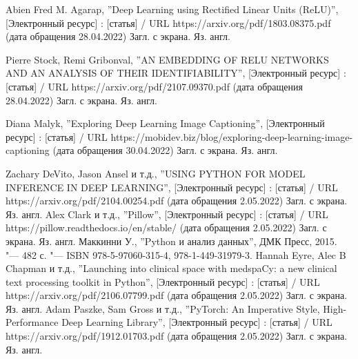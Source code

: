 \documentclass[bachelor, och, coursework]{SCWorks}
\begin{document}
\begin{thebibliography}{99}

     Abien Fred M. Agarap, ''Deep Learning using Rectified Linear
    Units (ReLU)'', [Электронный ресурс] : [статья] / URL
    https://arxiv.org/pdf/1803.08375.pdf (дата обращения 28.04.2022) Загл. с
    экрана. Яз. англ.

     Pierre Stock, Remi Gribonval, ''AN EMBEDDING OF RELU
    NETWORKS AND AN ANALYSIS OF THEIR IDENTIFIABILITY'', [Электронный ресурс] :
    [статья] / URL https://arxiv.org/pdf/2107.09370.pdf (дата обращения
    28.04.2022) Загл. с экрана. Яз. англ.
    

     Diana Malyk, ''Exploring Deep Learning Image
    Captioning'', [Электронный ресурс] : [статья] / URL
    https://mobidev.biz/blog/exploring-deep-learning-image-captioning (дата
    обращения 30.04.2022) Загл. с экрана. Яз. англ.

     Zachary DeVito, Jason Ansel и т.д., ''USING PYTHON FOR MODEL
    INFERENCE IN DEEP LEARNING'', [Электронный ресурс] : [статья] / URL
    https://arxiv.org/pdf/2104.00254.pdf (дата обращения 2.05.2022) Загл. с
    экрана. Яз. англ.
     Alex Clark и т.д., ''Pillow'', [Электронный ресурс] : [статья]
    / URL https://pillow.readthedocs.io/en/stable/ (дата обращения 2.05.2022)
    Загл. с экрана. Яз. англ.
     Маккинни У., ''Python и анализ данных'', ДМК Пресс, 2015.
    "--- 482 с. "--- ISBN 978-5-97060-315-4, 978-1-449-31979-3.
     Hannah Eyre, Alec B Chapman и т.д., ''Launching into clinical
    space with medspaCy: a new clinical text processing toolkit in Python'',
    [Электронный ресурс] : [статья] / URL https://arxiv.org/pdf/2106.07799.pdf
    (дата обращения 2.05.2022) Загл. с экрана. Яз. англ.
     Adam Paszke, Sam Gross и т.д., ''PyTorch: An Imperative
    Style, High-Performance Deep Learning Library'', [Электронный ресурс] :
    [статья] / URL https://arxiv.org/pdf/1912.01703.pdf (дата обращения
    2.05.2022) Загл. с экрана. Яз. англ.

\end{thebibliography}
\end{document}
